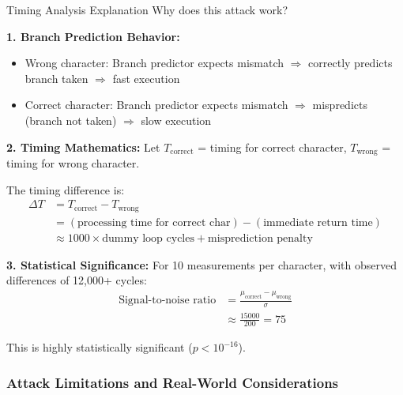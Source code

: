 \documentclass[11pt,a4paper]{article}
\theoremstyle{definition}
\begin{document}
\begin{mathematicsbox}{Timing Analysis Explanation}
Why does this attack work?

\textbf{1. Branch Prediction Behavior:}
\begin{itemize}
    \item Wrong character: Branch predictor expects mismatch $\Rightarrow$ correctly predicts branch taken $\Rightarrow$ fast execution
    \item Correct character: Branch predictor expects mismatch $\Rightarrow$ mispredicts (branch not taken) $\Rightarrow$ slow execution
\end{itemize}

\textbf{2. Timing Mathematics:}
Let $T_{\text{correct}}$ = timing for correct character, $T_{\text{wrong}}$ = timing for wrong character.

The timing difference is:
\begin{align}
\Delta T &= T_{\text{correct}} - T_{\text{wrong}} \\
&= (\text{processing time for correct char}) - (\text{immediate return time}) \\
&\approx 1000 \times \text{dummy loop cycles} + \text{misprediction penalty}
\end{align}

\textbf{3. Statistical Significance:}
For 10 measurements per character, with observed differences of 12,000+ cycles:
\begin{align}
\text{Signal-to-noise ratio} &= \frac{\mu_{\text{correct}} - \mu_{\text{wrong}}}{\sigma} \\
&\approx \frac{15000}{200} = 75
\end{align}

This is highly statistically significant ($p < 10^{-16}$).
\end{mathematicsbox}

\subsubsection{Attack Limitations and Real-World Considerations}
\end{document}
